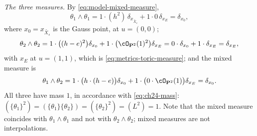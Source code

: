 \begin{example}
\emph{The three measures.}  By \eqref{eq:model-mixed-measure},
\[
 \theta_1\wedge\theta_1
 =1\cdot(h^2)\,\delta_{x_{\widetilde{X_s}}}+1\cdot0\,\delta_{x_E}
 =\delta_{x_0},
\]
where \(x_0=x_{\widetilde{X_s}}\) is the Gauss point, at \(u=(0,0)\);
\[
 \theta_2\wedge\theta_2
 =1\cdot\bigl((h-e)^2\bigr)\delta_{x_0}
  +1\cdot\bigl(\cO_{\mathbf P^2}(1)^2\bigr)\delta_{x_E}
 =0\cdot\delta_{x_0}+1\cdot\delta_{x_E}
 =\delta_{x_E},
\]
with \(x_E\) at \(u=(1,1)\), which is
\eqref{eq:metrics-toric-measure}; and the mixed measure is
\begin{equation}
\label{eq:ch24-toric-mixed}
 \theta_1\wedge\theta_2
 =1\cdot\bigl(h\cdot(h-e)\bigr)\delta_{x_0}
  +1\cdot\bigl(0\cdot\cO_{\mathbf P^2}(1)\bigr)\delta_{x_E}
 =\delta_{x_0}.
\end{equation}
All three have mass \(1\), in accordance with \eqref{eq:ch24-mass}:
\((\{\theta_1\}^2)=(\{\theta_1\}\{\theta_2\})=(\{\theta_2\}^2)=(L^2)=1\).
Note that the mixed measure coincides with \(\theta_1\wedge\theta_1\) and
not with \(\theta_2\wedge\theta_2\); mixed measures are not interpolations.


\end{example}
